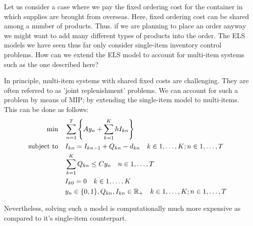 \begin{exercise}
Let us consider a case where we pay the fixed ordering cost for the container in which supplies are brought from overseas. Here, fixed ordering cost can be shared among a number of products. Thus. if we are planning to place an order anyway we might want to add many different types of products into the order. The ELS models we have seen thus far only consider single-item inventory control problems. How can we extend the ELS model to account for multi-item systems such as the one described here? 


\begin{solution}
In principle, multi-item systems with shared fixed costs are challenging. They are often referred to as 'joint replenishment' problems. We can account for such a problem by means of MIP; by extending the single-item model to multi-items. This can be done as follows:
\begin{align*}
\min\quad 
	& \sum_{n=1}^T \left\{A y_n + \sum_{k=1}^K h I_{kn}\right\} \\
\operatorname*{\operatorname{subject}\,\operatorname{to}}\quad
	& I_{kn} = I_{kn-1} + Q_{kn} - d_{kn} \quad k\in 1,\ldots,K; n\in 1,\ldots,T \\
	& \sum_{k=1}^K Q_{kn} \leq C y_n \quad n\in 1,\ldots,T \\
	& I_{k0} = 0 \quad k\in 1,\ldots,K \\
	& y_n \in \{0,1\}, Q_{kn}, I_{kn} \in \mathbb{R}_+ \quad k\in 1,\ldots,K; n\in 1,\ldots,T
\end{align*}

Nevertheless, solving such a model is computationally much more expensive as compared to it's single-item counterpart.

 
\end{solution}
\end{exercise}






